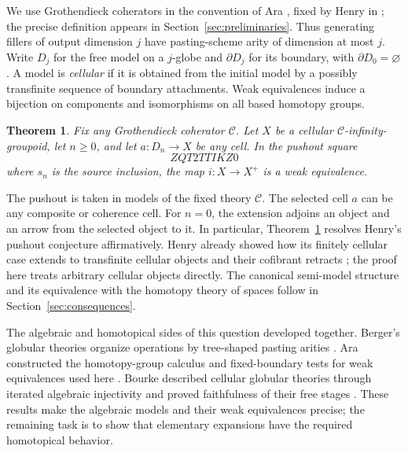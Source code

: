 \documentclass[11pt,letterpaper]{article}
\numberwithin{equation}{section}
\theoremstyle{plain}
\newtheorem{theorem}{Theorem}[section]
\theoremstyle{definition}
\theoremstyle{remark}
\begin{document}
We use Grothendieck coherators in the convention of Ara
\cite[Sections~2.3 and~2.9--2.11]{Ara2013}, fixed by Henry in
\cite[Section~5.3]{Henry2016}; the precise definition appears in
Section~\ref{sec:preliminaries}.  Thus generating fillers of output
dimension \(j\) have pasting-scheme arity of dimension at most \(j\).
Write \(D_j\) for the free model on a \(j\)-globe and \(\partial D_j\)
for its boundary, with \(\partial D_0=\varnothing\).
A model is \emph{cellular} if it is obtained from the initial model by
a possibly transfinite sequence of boundary attachments.
Weak equivalences induce a bijection on components and isomorphisms on
all based homotopy groups.

\begin{samepage}
\begin{theorem}\label{thm:main}
Fix any Grothendieck coherator \(\mathcal C\).
Let \(X\) be a cellular \(\mathcal C\)-infinity-groupoid, let \(n\ge0\),
and let \(a:D_n\to X\) be any cell.  In the pushout square
\[
ZQT2TTIKZ0
\]
where \(s_n\) is the source inclusion, the map \(i:X\to X^+\)
is a weak equivalence.
\end{theorem}
\end{samepage}

The pushout is taken in models of the fixed theory \(\mathcal C\).
The selected cell \(a\) can be any composite or coherence cell.
For \(n=0\), the extension adjoins an object and an arrow from the selected
object to it.  In particular, Theorem~\ref{thm:main} resolves Henry's
pushout conjecture affirmatively.  Henry already showed how its
finitely cellular case extends to transfinite cellular objects and their
cofibrant retracts \cite[Lemma~5.3.4]{Henry2016}; the proof here treats
arbitrary cellular objects directly.
The canonical semi-model structure and its equivalence with the homotopy
theory of spaces follow in Section~\ref{sec:consequences}.

The algebraic and homotopical sides of this question developed together.
Berger's globular theories organize operations by tree-shaped pasting
arities \cite[Definition~1.5]{Berger2002}.
Ara constructed the homotopy-group calculus and fixed-boundary tests
for weak equivalences used here \cite[Section~4]{Ara2013}.
Bourke described cellular globular theories through iterated algebraic
injectivity and proved faithfulness of their free stages
\cite[Theorems~3.12 and~5.2]{Bourke2020}.
These results make the algebraic models and their weak equivalences
precise; the remaining task is to show that elementary expansions have
the required homotopical behavior.
\end{document}
